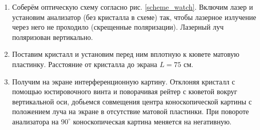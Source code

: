 \documentclass[a4paper, 12pt]{article}
\begin{document}
\begin{enumerate}
	\item Соберём оптическую схему согласно рис. \ref{scheme_watch}. Включим лазер и установим анализатор (без кристалла в схеме) так, чтобы лазерное излучение через него не проходило (скрещенные поляризации). Лазерный луч поляризован вертикально.

	\item Поставим кристалл и установим перед ним вплотную к кювете матовую пластинку. Расстояние от кристалла до экрана $L = 75$ см.

	\item Получим на экране интерференционную картину. Отклоняя кристалл с помощью юстировочного винта и поворачивая рейтер с кюветой вокруг вертикальной оси, добьемся совмещения центра коноскопической картины с положением луча на экране в отсутствие матовой пластинки. При повороте анализатора на $90^\circ$ коноскопическая картина меняется на негативную.


\end{enumerate}
\end{document}

